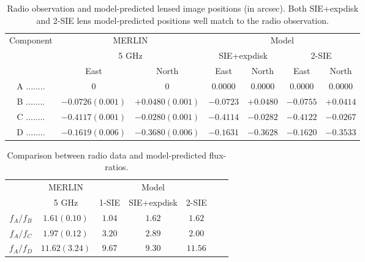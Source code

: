 \documentclass[useAMS,usenatbib]{mn2e}
\begin{document}
\begin{table}
 \begin{minipage}{140mm}
  \caption{Radio observation \citep{Marlow99} and model-predicted lensed image positions (in arcsec). Both SIE+expdisk and 2-SIE lens model-predicted positions well match to the radio observation.}
  \begin{tabular}{@{}ccccccc}

\hline

Component	&\multicolumn{2}{c}{MERLIN} 	 & \multicolumn{4}{c}{Model} \\
					&\multicolumn{2}{c}{5 GHz}		&	\multicolumn{2}{c}{SIE+expdisk} &\multicolumn{2}{c}{ 2-SIE}		\\
					 &East &North &East 		&North &East 		&North\\ 
\hline
A ........ &$0$    		&$0$		&$0.0000$ &$0.0000$   &   $0.0000$   &  $ 0.0000$\\  
B ........ &$-0.0726(0.001)$ 	&$+0.0480(0.001)$	&$-0.0723$ &$+0.0480$ & $-0.0755 $  &  $+0.0414$  \\  
C ........ &$-0.4117(0.001)$  &$-0.0280(0.001)$	&$-0.4114$ &$-0.0282$  & $-0.4122 $  &   $-0.0267$ \\  
D ........ &$-0.1619(0.006)$  &$-0.3680(0.006)$	&$-0.1631$ &$-0.3628$  & $-0.1620$    &  $-0.3533$ \\  
\hline
\end{tabular}

\end{minipage}
\medskip



\end{table}

\begin{table}
  \caption{Comparison between radio data \citep{K03} and model-predicted flux-ratios.}
  \begin{tabular}{@{}ccccccc}

\hline
	& MERLIN  & \multicolumn{3}{c}{Model}\\
		&5 GHz   & 1-SIE & SIE+expdisk & 2-SIE\\
\hline
$f_A/f_B$			&$1.61 (0.10)$ &$1.04$& $1.62$ & $1.62$ \\ 
$f_A/f_C$		&$1.97 (0.12)$ 	 &$3.20$ & $2.89$ & $2.00$\\
$f_A/f_D$		&$11.62 (3.24)$  &$9.67$& $9.30$ & $11.56$\\

\hline
\end{tabular}

\medskip


\end{table}
\end{document}
